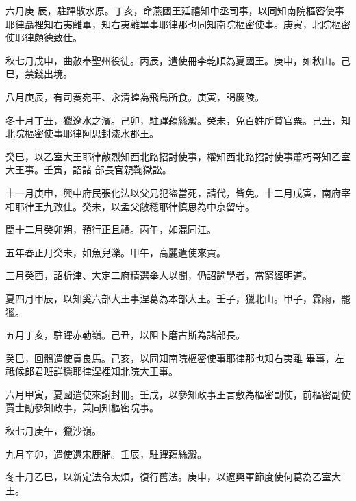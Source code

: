 \begin{pinyinscope}
 六月庚
 辰，駐蹕散水原。丁亥，命燕國王延禧知中丞司事，以同知南院樞密使事耶律聶裡知右夷離畢，知右夷離畢事耶律那也同知南院樞密使事。庚寅，北院樞密使耶律頗德致仕。



 秋七月戊申，曲赦奉聖州役徒。丙辰，遣使冊李乾順為夏國王。庚申，如秋山。己巳，禁錢出境。



 八月庚辰，有司奏宛平、永清蝗為飛鳥所食。庚寅，謁慶陵。



 冬十月丁丑，獵遼水之濱。己卯，駐蹕藕絲澱。癸未，免百姓所貸官粟。己丑，知北院樞密使事耶律阿思封漆水郡王。



 癸巳，以乙室大王耶律敵烈知西北路招討使事，權知西北路招討使事蕭朽哥知乙室大王事。壬寅，詔諸
 部長官親鞠獄訟。



 十一月庚申，興中府民張化法以父兄犯盜當死，請代，皆免。十二月戊寅，南府宰相耶律王九致仕。癸未，以孟父敞穩耶律慎思為中京留守。



 閏十二月癸卯朔，預行正且禮。丙午，如混同江。



 五年春正月癸未，如魚兒濼。甲午，高麗遣使來貢。



 三月癸酉，詔析津、大定二府精選舉人以聞，仍詔諭學者，當窮經明道。



 夏四月甲辰，以知奚六部大王事涅葛為本部大王。壬子，獵北山。甲子，霖雨，罷獵。



 五月丁亥，駐蹕赤勒嶺。己丑，以阻卜磨古斯為諸部長。



 癸巳，回鶻遣使貢良馬。己亥，以同知南院樞密使事耶律那也知右夷離
 畢事，左祗候郎君班詳穩耶律涅裡知北院大王事。



 六月甲寅，夏國遣使來謝封冊。壬戌，以參知政事王言敷為樞密副使，前樞密副使賈士勛參知政事，兼同知樞密院事。



 秋七月庚午，獵沙嶺。



 九月辛卯，遣使遺宋鹿脯。壬辰，駐蹕藕絲澱。



 冬十月乙巳，以新定法令太煩，復行舊法。庚申，以遼興軍節度使何葛為乙室大王。




\end{pinyinscope}
